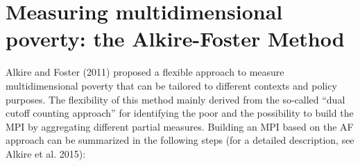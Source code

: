 \hypertarget{measuring-multidimensional-poverty-the-alkire-foster-method}{%
\section{Measuring multidimensional poverty: the Alkire-Foster Method}\label{measuring-multidimensional-poverty-the-alkire-foster-method}}

Alkire and Foster (2011) proposed a flexible approach to measure multidimensional poverty
that can be tailored to different contexts and policy purposes. The
flexibility of this method mainly derived from the so-called ``dual
cutoff counting approach'' for identifying the poor and the possibility
to build the MPI by aggregating different partial measures. Building an
MPI based on the AF approach can be summarized in the following steps
(for a detailed description, see Alkire et al. 2015):

